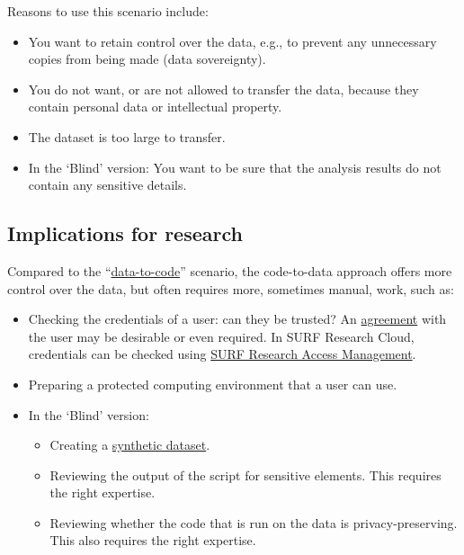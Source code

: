 \documentclass[
]{book}
\providecommand{\tightlist}{%
  \setlength{\itemsep}{0pt}\setlength{\parskip}{0pt}}
\begin{document}
Reasons to use this scenario include:

\begin{itemize}
\tightlist
\item
  You want to retain control over the data, e.g., to prevent any unnecessary
  copies from being made (data sovereignty).
\item
  You do not want, or are not allowed to transfer the data, because they contain
  personal data or intellectual property.
\item
  The dataset is too large to transfer.
\item
  In the `Blind' version: You want to be sure that the analysis results do not
  contain any sensitive details.
\end{itemize}

\hypertarget{implications-for-research-1}{%
\subsection{Implications for research}\label{implications-for-research-1}}

Compared to the ``\protect\hyperlink{data-to-code}{data-to-code}'' scenario, the code-to-data
approach offers more control over the data, but often requires more, sometimes
manual, work, such as:

\begin{itemize}
\tightlist
\item
  Checking the credentials of a user: can they be trusted? An
  \protect\hyperlink{agreements}{agreement} with the user may be desirable or even required. In
  SURF Research Cloud, credentials can be checked using
  \href{https://www.surf.nl/en/surf-research-access-management-easy-and-secure-access-to-research-services}{SURF Research Access Management}.
\item
  Preparing a protected computing environment that a user can use.
\item
  In the `Blind' version:

  \begin{itemize}
  \tightlist
  \item
    Creating a \protect\hyperlink{synthetic-data}{synthetic dataset}.
  \item
    Reviewing the output of the script for sensitive elements. This requires
    the right expertise.
  \item
    Reviewing whether the code that is run on the data is privacy-preserving.
    This also requires the right expertise.
  \end{itemize}
\end{itemize}
\end{document}
